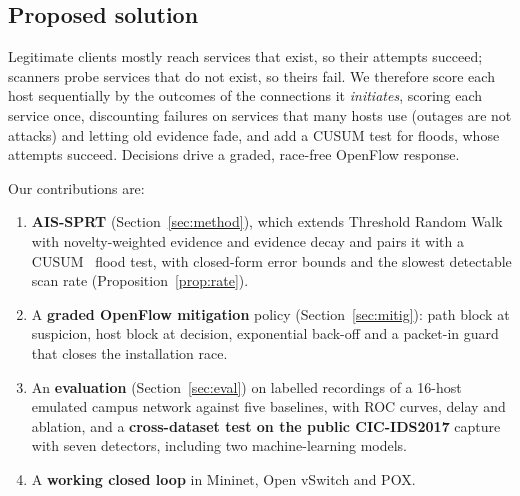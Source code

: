 \documentclass[conference]{IEEEtran}
\begin{document}
\subsection*{Proposed solution}
Legitimate clients mostly reach services that exist, so their attempts succeed; scanners probe services that do not exist,
so theirs fail. We therefore score each host sequentially by the outcomes of the connections it \emph{initiates}, scoring
each service once, discounting failures on services that many hosts use (outages are not attacks) and letting old evidence
fade, and add a CUSUM test for floods, whose attempts succeed. Decisions drive a graded, race-free OpenFlow response.

Our contributions are:
\begin{enumerate}
\item \textbf{AIS-SPRT} (Section~\ref{sec:method}), which extends Threshold Random Walk~\cite{jung2004trw} with
novelty-weighted evidence and evidence decay and pairs it with a CUSUM~\cite{page1954cusum} flood test, with closed-form
error bounds and the slowest detectable scan rate (Proposition~\ref{prop:rate}).
\item A \textbf{graded OpenFlow mitigation} policy (Section~\ref{sec:mitig}): path block at suspicion, host block at
decision, exponential back-off and a packet-in guard that closes the installation race.
\item An \textbf{evaluation} (Section~\ref{sec:eval}) on \NRuns{} labelled recordings of a 16-host emulated campus network
against five baselines, with ROC curves, delay and ablation, and a \textbf{cross-dataset test on the public CIC-IDS2017}
capture with seven detectors, including two machine-learning models.
\item A \textbf{working closed loop} in Mininet, Open vSwitch and POX.
\end{enumerate}

\end{document}
